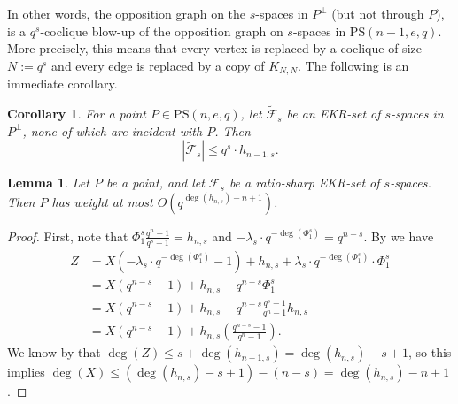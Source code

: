 \documentclass[11pt]{article}
\newtheorem{lemma}[thm]{Lemma}
\newtheorem{cor}[thm]{Corollary}
\newcommand{\EKR}{\mathcal{F}}
\newcommand{\PS}{\mathrm{PS}}
\newcommand{\philipp}[1]{\textcolor{blue}{#1}}
\renewcommand{\le}{\leqslant}
\renewcommand{\leq}{\leqslant}
\begin{document}
In other words, the opposition graph on the $s$-spaces in $P^\perp$ (but not through $P$), is a $q^s$-coclique blow-up of the opposition graph on $s$-spaces in $\PS(n-1,e,q)$. More precisely, this means that every vertex is replaced by a coclique of size $N:=q^s$ and every edge is replaced by a copy of $K_{N,N}$.  The following is an immediate corollary.

\begin{cor}\label{cor:EKRboundinperp}
    For a point $P \in \PS(n,e,q)$, let $\widetilde{\EKR}_s$ be an EKR-set of $s$-spaces in $P^\perp$, none of which are incident with $P$. Then 
    \[|\widetilde{\EKR}_s| \leq q^s \cdot h_{n-1,s}.\]
\end{cor}


\begin{lemma} \label{L: points are very light}
    Let $P$ be a point, and let $\EKR_s$ be a ratio-sharp EKR-set of $s$-spaces. Then $P$ has weight at most $O(q^{\deg(h_{n,s})-n+1})$.
\end{lemma}
\begin{proof}
First, note that $\Phi_1^s \frac{q^n-1}{q^s-1}=h_{n,s}$ and  $-\lambda_s \cdot q^{-\deg(\Phi_1^s)} = q^{n-s}$. 
    By  we have 
    \begin{align*}
        Z&= X(-\lambda_s \cdot q^{-\deg(\Phi_1^s)}-1)+h_{n,s}+\lambda_s \cdot q^{-\deg(\Phi_1^s)} \cdot \Phi_1^s\\
        &= X(q^{n-s}-1)+h_{n,s}-q^{n-s}\Phi_1^s\\
        &=X(q^{n-s}-1)+h_{n,s}-q^{n-s} \frac{q^s-1}{q^n-1}h_{n,s}\\
        &= X(q^{n-s}-1)+h_{n,s}\left(\frac{q^{n-s}-1}{q^n-1}\right).
    \end{align*}
We know by  that 
$\deg(Z) \le s+ \deg(h_{n-1,s})=\deg(h_{n,s})-s+1$, so this implies $\deg(X) \le (\deg(h_{n,s})-s+1) -(n-s)=\deg(h_{n,s})-n+1$.
\end{proof}
\end{document}
